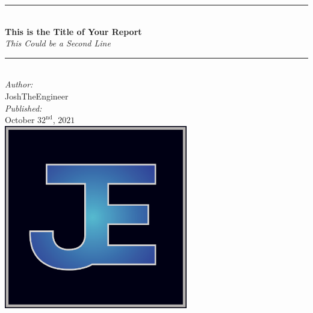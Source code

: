 \documentclass[letterpaper,12pt]{article}
\newcommand{\HRule}{\rule{\linewidth}{0.5mm}} 	%
\begin{document}
\begin{titlepage}

\center

\HRule \\[0.6cm]
{ \huge \textbf{This is the Title of Your Report} \\[0.4cm] \textit{This Could be a Second Line}}\\[0.4cm]
\HRule \\[1.5cm]

\Large \emph{Author:}\\
JoshTheEngineer\\[1cm]

\Large \emph{Published:}\\
October $32^\text{nd}$, $2021$ \\[3cm]

\includegraphics[width=8cm]{JTE_Logo_PNG.png}\\[1cm]

\vfill

\end{titlepage}

\pagestyle{headings}				%
\tableofcontents					%
\newpage							%
\listoffigures						%
\newpage							%
\listoftables						%
\newpage							%
\end{document}
